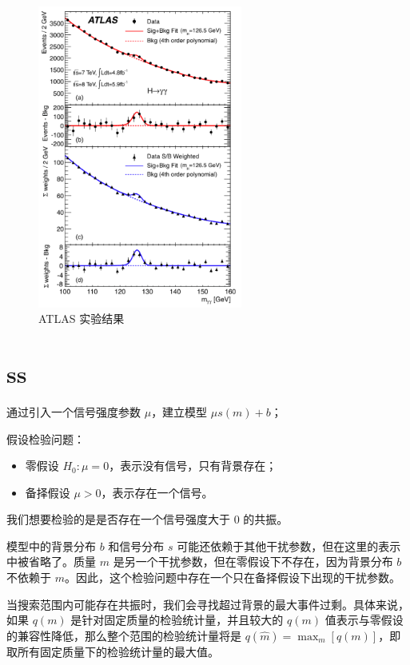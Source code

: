 \begin{figure}[htbp]
    \centering
    \includegraphics[width=0.6\textwidth]{pic/atlas.png}
    \caption{ATLAS 实验结果}
    \label{fig:ATLAS}
\end{figure}

\section{ss}

通过引入一个信号强度参数 $\mu$，建立模型 $\mu s(m) + b$；

假设检验问题：

\begin{itemize}
    \item 零假设 $H_0: \mu=0$，表示没有信号，只有背景存在；
    \item 备择假设 $\mu > 0$，表示存在一个信号。
\end{itemize}

我们想要检验的是是否存在一个信号强度大于 $0$ 的共振。

模型中的背景分布 $b$ 和信号分布 $s$ 可能还依赖于其他干扰参数，但在这里的表示中被省略了。质量 $m$ 是另一个干扰参数，但在零假设下不存在，因为背景分布 $b$ 不依赖于 $m$。因此，这个检验问题中存在一个只在备择假设下出现的干扰参数。

当搜索范围内可能存在共振时，我们会寻找超过背景的最大事件过剩。具体来说，如果 $q(m)$ 是针对固定质量的检验统计量，并且较大的 $q(m)$ 值表示与零假设的兼容性降低，那么整个范围的检验统计量将是 $q(\hat{m})=\max_m ⁡[q(m)]$，即取所有固定质量下的检验统计量的最大值。

